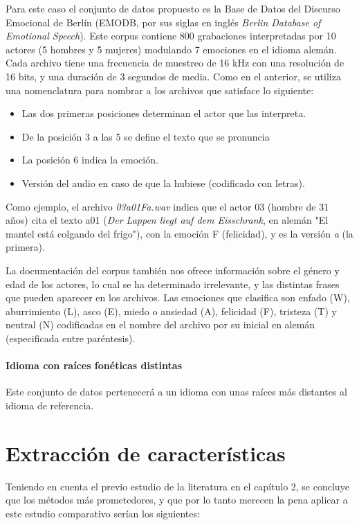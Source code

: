 \documentclass[11pt,a4paper,spanish]{book}
\begin{document}
	Para este caso el conjunto de datos propuesto es la Base de Datos del Discurso Emocional de Berlín (EMODB, por sus siglas en inglés \emph{Berlin Database of Emotional Speech}). Este corpus contiene 800 grabaciones interpretadas por 10 actores (5 hombres y 5 mujeres) modulando 7 emociones en el idioma alemán. Cada archivo tiene una frecuencia de muestreo de 16 kHz con una resolución de 16 bits, y una duración de 3 segundos de media. Como en el anterior, se utiliza una nomenclatura para nombrar a los archivos que satisface lo siguiente:
	\begin{itemize}
		\item Las dos primeras posiciones determinan el actor que las interpreta.
		\item De la posición 3 a las 5 se define el texto que se pronuncia
		\item La posición 6 indica la emoción.
		\item Versión del audio en caso de que la hubiese (codificado con letras).
	\end{itemize}

	Como ejemplo, el archivo \emph{03a01Fa.wav} indica que el actor 03 (hombre de 31 años) cita el texto a01 (\emph{Der Lappen liegt auf dem Eisschrank}, en alemán "El mantel está colgando del frigo"), con la emoción F (felicidad), y es la versión \emph{a} (la primera).
	
	La documentación del corpus también nos ofrece información sobre el género y edad de los actores, lo cual se ha determinado irrelevante, y las distintas frases que pueden aparecer en los archivos.
	Las emociones que clasifica son enfado (W), aburrimiento (L), asco (E), miedo o ansiedad (A), felicidad (F), tristeza (T) y neutral (N) codificadas en el nombre del archivo por su inicial en alemán (especificada entre paréntesis).


	
	\paragraph{Idioma con raíces fonéticas distintas} Este conjunto de datos pertenecerá a un idioma con unas raíces más distantes al idioma de referencia.\\
	
	
	\section{Extracción de características}
	Teniendo en cuenta el previo estudio de la literatura en el capítulo 2, se concluye que los métodos más prometedores, y que por lo tanto merecen la pena aplicar a este estudio comparativo serían los siguientes:
\end{document}
